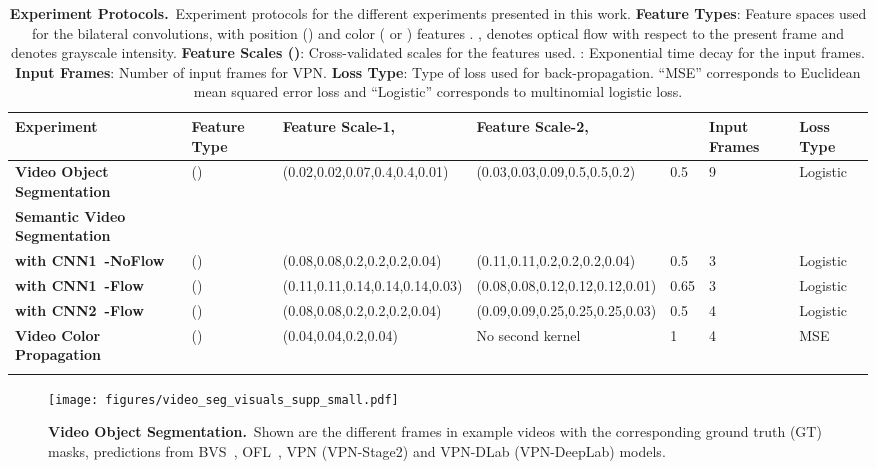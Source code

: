 \documentclass[10pt,twocolumn,letterpaper]{article}
\newcommand{\mycaption}[2]{\caption{\small \textbf{#1.}~#2}}
\begin{document}
\begin{table*}[h]
\scriptsize
  \centering
    \begin{tabular}{L{3.2cm} L{3.0cm} L{2.8cm} L{2.8cm} C{0.5cm} C{1.0cm} L{1.2cm}}
      \toprule
\textbf{Experiment} & \textbf{Feature Type} & \textbf{Feature Scale-1, } & \textbf{Feature Scale-2, } & \textbf{} & \textbf{Input Frames} & \textbf{Loss Type} \\
      \midrule
      \textbf{Video Object Segmentation} & () & (0.02,0.02,0.07,0.4,0.4,0.01) & (0.03,0.03,0.09,0.5,0.5,0.2) & 0.5 & 9 & Logistic\\
      \midrule
      \textbf{Semantic Video Segmentation} & & & & & \\
      \textbf{with CNN1~\cite{yu2015multi}-NoFlow} & () & (0.08,0.08,0.2,0.2,0.2,0.04) & (0.11,0.11,0.2,0.2,0.2,0.04) & 0.5 & 3 & Logistic \\
      \textbf{with CNN1~\cite{yu2015multi}-Flow} & () & (0.11,0.11,0.14,0.14,0.14,0.03) & (0.08,0.08,0.12,0.12,0.12,0.01) & 0.65 & 3 & Logistic\\
      \textbf{with CNN2~\cite{richter2016playing}-Flow} & () & (0.08,0.08,0.2,0.2,0.2,0.04) & (0.09,0.09,0.25,0.25,0.25,0.03) & 0.5 & 4 & Logistic\\
      \midrule
      \textbf{Video Color Propagation} & ()  & (0.04,0.04,0.2,0.04) & No second kernel & 1 & 4 & MSE\\
      \bottomrule
      \\
    \end{tabular}
    \mycaption{Experiment Protocols} {Experiment protocols for the different experiments presented in this work. \textbf{Feature Types}:
    Feature spaces used for the bilateral convolutions, with position () and color
    ( or ) features . ,  denotes optical flow with respect
    to the present frame and  denotes grayscale intensity.
    \textbf{Feature Scales ()}: Cross-validated scales for the features used.
    \textbf{}: Exponential time decay for the input frames.
    \textbf{Input Frames}: Number of input frames for VPN.
    \textbf{Loss Type}: Type
     of loss used for back-propagation. ``MSE'' corresponds to Euclidean mean squared error loss and ``Logistic'' corresponds to multinomial logistic loss.}
  \label{tbl:parameters_supp}
\end{table*}

\begin{figure}[th!]
\begin{center}
  \centerline{\texttt{[image: figures/video\_seg\_visuals\_supp\_small.pdf]}}
    \mycaption{Video Object Segmentation}
    {Shown are the different frames in example videos with the corresponding
    ground truth (GT) masks, predictions from BVS~\cite{marki2016bilateral},
    OFL~\cite{tsaivideo}, VPN (VPN-Stage2) and VPN-DLab (VPN-DeepLab) models.}
    \label{fig:video_seg_small_supp}
\end{center}
\vspace{-1.0cm}
\end{figure}
\end{document}
